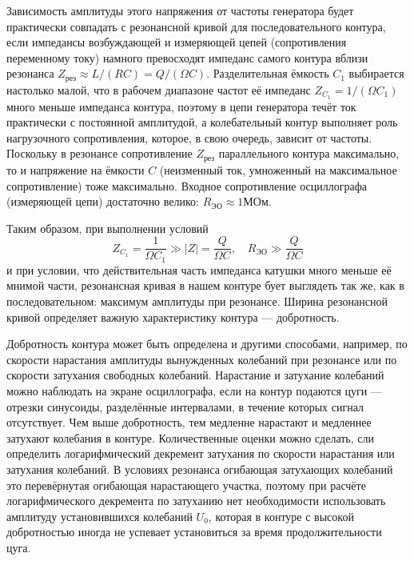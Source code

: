 \documentclass[a4paper, 12pt]{article}
\begin{document}
	Зависимость амплитуды этого напряжения от частоты генератора будет практически совпадать 
	с резонансной кривой для последовательного контура, если импедансы возбуждающей и измеряющей 
	цепей (сопротивления переменному току) намного превосходят импеданс самого контура вблизи 
	резонанса $Z_\text{рез} \approx L / (RC) = Q / (\Omega C)$. Разделительная ёмкость $C_1$ 
	выбирается настолько малой, что в рабочем диапазоне частот её импеданс $Z_{C_1} = 1/(\Omega C_1)$
	 много меньше импеданса контура, поэтому в цепи генератора течёт ток практически с постоянной 
	 амплитудой, а колебательный контур выполняет роль нагрузочного сопротивления, которое, в свою 
	 очередь, зависит от частоты. Поскольку в резонансе сопротивление $Z_\text{рез}$ параллельного 
	 контура максимально, то и напряжение на ёмкости $C$ (неизменный ток, умноженный на максимальное 
	 сопротивление) тоже максимально. Входное сопротивление осциллографа (измеряющей цепи) достаточно 
	 велико: $R_\text{ЭО} \approx 1 \text{МОм}$.
	
	Таким образом, при выполнении условий
	\begin{equation}
		Z_{C_1} = \frac{1}{\Omega C_1} \gg |Z| = \frac{Q}{\Omega C}, \quad R_\text{ЭО} \gg \frac{Q}{\Omega C}
	\end{equation}
	и при условии, что действительная часть импеданса катушки много меньше её мнимой части, резонансная кривая в нашем контуре бует выглядеть так же, как в последовательном: максимум амплитуды при резонансе. Ширина резонансной кривой определяет важную характеристику контура --- добротность.
	
	Добротность контура может быть определена и другими способами, например, по скорости нарастания амплитуды вынужденных колебаний при резонансе или по скорости затухания свободных колебаний. Нарастание и затухание колебаний можно наблюдать на экране осциллографа, если на контур подаются цуги --- отрезки синусоиды, разделённые интервалами, в течение которых сигнал отсутствует. Чем выше добротность, тем медленне нарастают и медленнее затухают колебания в контуре. Количественные оценки можно сделать, сли определить логарифмический декремент затухания по скорости нарастания или затухания колебаний. В условиях резонанса огибающая затухающих колебаний это перевёрнутая огибающая нарастающего участка, поэтому при расчёте логарифмического декремента по затуханию нет необходимости использовать амплитуду установившихся колебаний $U_0$, которая в контуре с высокой добротностью иногда не успевает установиться за время продолжительности цуга.
\end{document}
